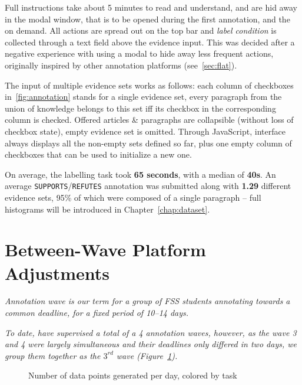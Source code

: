 Full instructions take about 5 minutes to read and understand, and are hid away in the  modal window, that is to be opened during the first annotation, and the on demand. All actions are spread out on the top bar and \textit{label condition} is collected through a text field above the evidence input. This was decided after a negative experience with using a modal  to hide away less frequent actions, originally inspired by other annotation platforms (see~\ref{sec:flat}).

The input of multiple evidence sets works as follows: each column of checkboxes in~\ref{fig:annotation} stands for a single evidence set, every paragraph from the union of knowledge belongs to this set iff its checkbox in the corresponding column is checked. Offered articles \& paragraphs are collapsible (without loss of checkbox state), empty evidence set is omitted. Through \textsf{JavaScript}, interface always displays all the non-empty sets defined so far, plus one empty column of checkboxes that can be used to initialize a new one.

On average, the labelling task took \textbf{65 seconds}, with a median of \textbf{40s}. An average \texttt{SUPPORTS}/\texttt{REFUTES} annotation was submitted along with \textbf{1.29} different evidence sets, 95\% of which were composed of a single paragraph -- full histograms will be introduced in Chapter~\ref{chap:dataset}.


\section{Between-Wave Platform Adjustments}
 \textit{\textit{Annotation wave} is our term for a group of \textsf{FSS} students annotating towards a common deadline, for a fixed period of 10--14 days.}
 
 \textit{To date, have supervised a total of a 4 annotation waves, however, as the wave 3 and 4 were largely simultaneous and their deadlines only differed in two days, we group them together as the \textit{$3^{rd}$ wave (Figure~\ref{fig:performance})}.}
 
  \begin{figure}[H]
\caption{Number of data points generated per day, colored by task}
\label{fig:performance}
\end{figure} %
 
